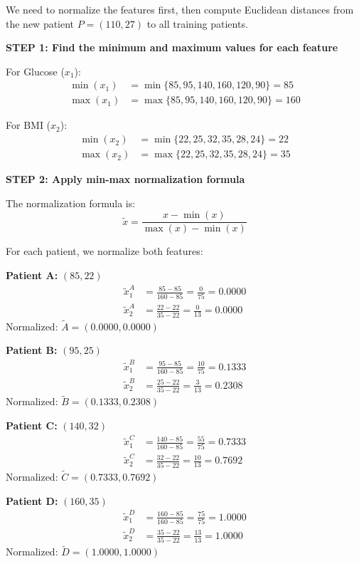 \documentclass[12pt]{article}
\begin{document}
\begin{solution}
We need to normalize the features first, then compute Euclidean distances from the new patient \(P = (110, 27)\) to all training patients.

\textbf{STEP 1: Find the minimum and maximum values for each feature}

For Glucose (\(x_1\)):
\begin{align*}
\min(x_1) &= \min\{85, 95, 140, 160, 120, 90\} = 85 \\
\max(x_1) &= \max\{85, 95, 140, 160, 120, 90\} = 160
\end{align*}

For BMI (\(x_2\)):
\begin{align*}
\min(x_2) &= \min\{22, 25, 32, 35, 28, 24\} = 22 \\
\max(x_2) &= \max\{22, 25, 32, 35, 28, 24\} = 35
\end{align*}

\textbf{STEP 2: Apply min-max normalization formula}

The normalization formula is:
\[
\tilde{x} = \frac{x - \min(x)}{\max(x) - \min(x)}
\]

For each patient, we normalize both features:

\textbf{Patient A:} \((85, 22)\)
\begin{align*}
\tilde{x}_1^A &= \frac{85 - 85}{160 - 85} = \frac{0}{75} = 0.0000 \\
\tilde{x}_2^A &= \frac{22 - 22}{35 - 22} = \frac{0}{13} = 0.0000
\end{align*}
Normalized: \(\tilde{A} = (0.0000, 0.0000)\)

\textbf{Patient B:} \((95, 25)\)
\begin{align*}
\tilde{x}_1^B &= \frac{95 - 85}{160 - 85} = \frac{10}{75} = 0.1333 \\
\tilde{x}_2^B &= \frac{25 - 22}{35 - 22} = \frac{3}{13} = 0.2308
\end{align*}
Normalized: \(\tilde{B} = (0.1333, 0.2308)\)

\textbf{Patient C:} \((140, 32)\)
\begin{align*}
\tilde{x}_1^C &= \frac{140 - 85}{160 - 85} = \frac{55}{75} = 0.7333 \\
\tilde{x}_2^C &= \frac{32 - 22}{35 - 22} = \frac{10}{13} = 0.7692
\end{align*}
Normalized: \(\tilde{C} = (0.7333, 0.7692)\)

\textbf{Patient D:} \((160, 35)\)
\begin{align*}
\tilde{x}_1^D &= \frac{160 - 85}{160 - 85} = \frac{75}{75} = 1.0000 \\
\tilde{x}_2^D &= \frac{35 - 22}{35 - 22} = \frac{13}{13} = 1.0000
\end{align*}
Normalized: \(\tilde{D} = (1.0000, 1.0000)\)


\end{solution}
\end{document}
